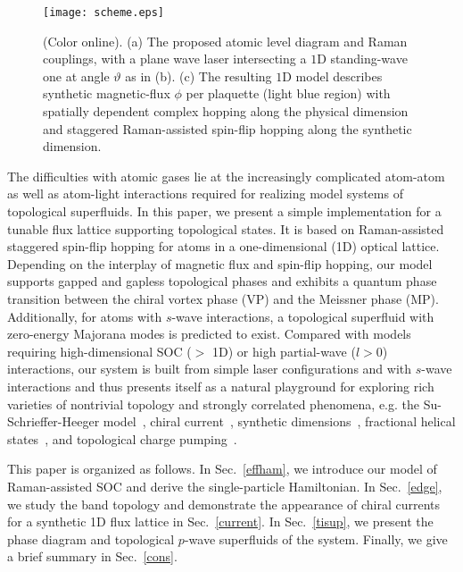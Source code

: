 \documentclass[twocolumn,prl,superscriptaddress,amsmath,amssymb]{revtex4} %
\begin{document}
\begin{figure}[tbp]
\texttt{[image: scheme.eps]}
\caption{(Color online). (a) The proposed atomic level diagram and Raman couplings, with a plane wave laser intersecting a $1$D standing-wave one at angle $\vartheta$ as in (b). (c) The resulting $1$D model describes synthetic magnetic-flux $\phi$ per plaquette (light blue region) with spatially dependent complex hopping along the physical dimension and staggered Raman-assisted spin-flip hopping along the synthetic dimension. }
\label{scheme}
\end{figure}

The difficulties with atomic gases lie at the increasingly complicated atom-atom as well as atom-light interactions required for realizing model systems of topological superfluids. In this paper, we present a simple implementation for a tunable flux lattice supporting topological states. It is based on Raman-assisted staggered spin-flip hopping for atoms in a one-dimensional (1D) optical lattice. Depending on the interplay of magnetic flux and spin-flip hopping, our model supports gapped and gapless topological phases and exhibits a quantum phase transition between the chiral vortex phase (VP) and the Meissner phase (MP).
Additionally, for atoms with $s$-wave interactions, a topological superfluid with zero-energy Majorana modes is predicted to exist. Compared with models requiring high-dimensional SOC ($>$ 1D) or high partial-wave ($l>0$) interactions, our system is built from simple laser configurations and with $s$-wave interactions and thus presents itself as a natural playground for exploring rich varieties of nontrivial topology and strongly correlated phenomena, e.g. the Su-Schrieffer-Heeger model~\cite{Atala13}, chiral  current~\cite{Atala14,Wei14,Hugel2014,Greschner15}, synthetic dimensions~\cite{Mancini15,Stuhl15,Celi14,Gra15}, fractional helical states~\cite{Zeng15,Barbarino15}, and topological charge pumping~\cite{Nakajima16,Lohse16}.

This paper is organized as follows. In Sec.~\ref{effham}, we introduce our model of Raman-assisted SOC and derive the single-particle Hamiltonian. In Sec.~\ref{edge}, we study the band topology and demonstrate the appearance of chiral currents for a synthetic 1D flux lattice in Sec.~\ref{current}. In Sec.~\ref{tisup}, we present the phase diagram and topological $p$-wave superfluids of the system. Finally, we give a brief summary in Sec.~\ref{cons}.
\end{document}
